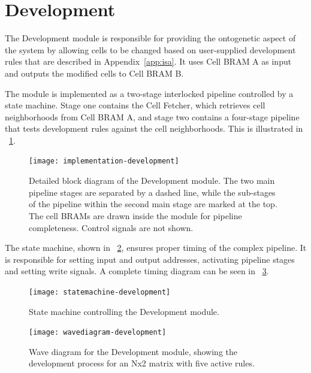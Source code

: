 \section{Development}
\label{sec:development}

The Development module is responsible for providing the ontogenetic aspect of the system by allowing cells to be changed based on user-supplied development rules that are described in Appendix~\ref{app:isa}.
It uses Cell BRAM A as input and outputs the modified cells to Cell BRAM B.

The module is implemented as a two-stage interlocked pipeline controlled by a state machine.
Stage one contains the Cell Fetcher, which retrieves cell neighborhoods from Cell BRAM A, and stage two contains a four-stage pipeline that tests development rules against the cell neighborhoods.
This is illustrated in \figurename~\ref{fig:implementation-development}.

\begin{figure}[!ht]
    \hspace{-4\block}
    \texttt{[image: implementation-development]}
    \caption[Development module]{
        Detailed block diagram of the Development module.
        The two main pipeline stages are separated by a dashed line,
        while the sub-stages of the pipeline within the second main stage are marked at the top.
        The cell BRAMs are drawn inside the module for pipeline completeness.
        Control signals are not shown.
    }
    \label{fig:implementation-development}
\end{figure}

The state machine, shown in \figurename~\ref{fig:statemachine-development}, ensures proper timing of the complex pipeline.
It is responsible for setting input and output addresses, activating pipeline stages and setting write signals.
A complete timing diagram can be seen in \figurename~\ref{fig:wavediagram-development}.

\begin{figure}[!ht]
    \centering
    \texttt{[image: statemachine-development]}
    \caption[Development module state machine]{
        State machine controlling the Development module.
    }
    \label{fig:statemachine-development}
\end{figure}

\begin{figure}
    \centering
    \texttt{[image: wavediagram-development]}
    \caption[Development module wave diagram]{
        Wave diagram for the Development module, showing the development process for an Nx2 matrix with five active rules.
    }
    \label{fig:wavediagram-development}
\end{figure}

